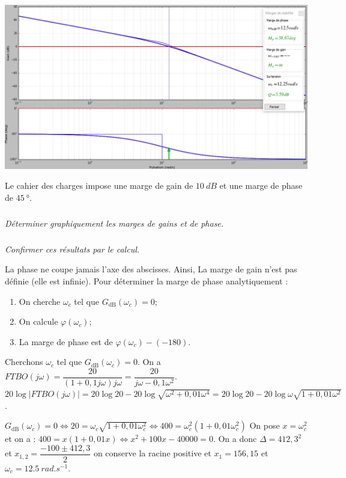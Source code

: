 \documentclass[10pt,fleqn]{article} %
\begin{document}
\begin{multicols}{2}
\begin{corrige}
\begin{center}
\includegraphics[width=\linewidth]{images/cor_01}
\end{center}
\end{corrige}
\else
\fi
Le cahier des charges impose une marge de gain de $\SI{10}{dB}$ et une marge de phase de $
\SI{45}{\degree}$.

\subparagraph{}\textit{Déterminer graphiquement les marges de gains et de phase.}
\ifprof
\begin{corrige}
\end{corrige}
\else
\fi

\subparagraph{}\textit{Confirmer ces résultats par le calcul.}
\ifprof
\begin{corrige}
La phase ne coupe jamais l'axe des abscisses. Ainsi, La marge de gain n'est pas définie (elle est infinie).
Pour déterminer la marge de phase analytiquement :
\begin{enumerate}
\item On cherche $\omega_c$ tel que $G_{\text{dB}}(\omega_c)=0$;
\item On calcule $\varphi(\omega_c)$;
\item La marge de phase est de $\varphi(\omega_c) -(-180)$.
\end{enumerate}

Cherchons $\omega_c$ tel que $G_{\text{dB}}(\omega_c)=0$. 
On a $FTBO(j\omega )
=\dfrac{20}{(1+0,1j\omega)j\omega}
=\dfrac{20}{j\omega-0,1\omega^2}$. 
$20\log |FTBO(j\omega )| 
= 20\log 20 - 20\log \sqrt{\omega^2+0,01\omega^4}
= 20\log 20 - 20\log \omega\sqrt{1+0,01\omega^2}$.

 $G_{\text{dB}}(\omega_c)=0 
\Leftrightarrow   20 =\omega_c\sqrt{1+0,01\omega_c^2} 
\Leftrightarrow   400 =\omega_c^2 \left(1+0,01\omega_c^2\right)$
On pose $x=\omega_c^2$ et on a :
$400 =x \left(1+0,01x\right)\Leftrightarrow x^2+100x-40000=0$. 
On a donc $\Delta = 412,3^2$ et $x_{1,2}=\dfrac{-100\pm412,3}{2}$ on conserve la racine positive et  $x_1=156,15$ et $\omega_c=\SI{12,5}{rad.s^{-1}}$.


\end{corrige}
\end{multicols}
\end{document}
